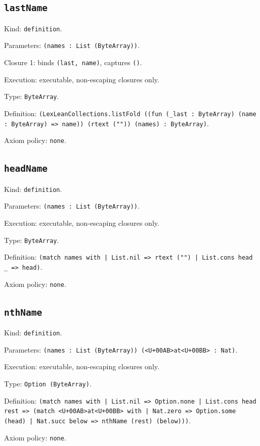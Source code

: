 \documentclass[11pt]{article}
\begin{document}
\subsection*{\texttt{lastName}}
\noindent Kind: \texttt{definition}.\par
\noindent Parameters: \texttt{(names : List (ByteArray))}.\par
\noindent Closure 1: binds \texttt{(last, name)}, captures \texttt{()}.\par
\noindent Execution: executable, non-escaping closures only.\par
\noindent Type: \texttt{ByteArray}.\par
\noindent Definition: \texttt{(LexLeanCollections.listFold ((fun (\_last : ByteArray) (name : ByteArray) => name)) (rtext ("")) (names) : ByteArray)}.\par
\noindent Axiom policy: \texttt{none}.\par
\subsection*{\texttt{headName}}
\noindent Kind: \texttt{definition}.\par
\noindent Parameters: \texttt{(names : List (ByteArray))}.\par
\noindent Execution: executable, non-escaping closures only.\par
\noindent Type: \texttt{ByteArray}.\par
\noindent Definition: \texttt{(match names with | List.nil => rtext ("") | List.cons head \_ => head)}.\par
\noindent Axiom policy: \texttt{none}.\par
\subsection*{\texttt{nthName}}
\noindent Kind: \texttt{definition}.\par
\noindent Parameters: \texttt{(names : List (ByteArray)) (<U+00AB>at<U+00BB> : Nat)}.\par
\noindent Execution: executable, non-escaping closures only.\par
\noindent Type: \texttt{Option (ByteArray)}.\par
\noindent Definition: \texttt{(match names with | List.nil => Option.none | List.cons head rest => (match <U+00AB>at<U+00BB> with | Nat.zero => Option.some (head) | Nat.succ below => nthName (rest) (below)))}.\par
\noindent Axiom policy: \texttt{none}.\par
\end{document}

